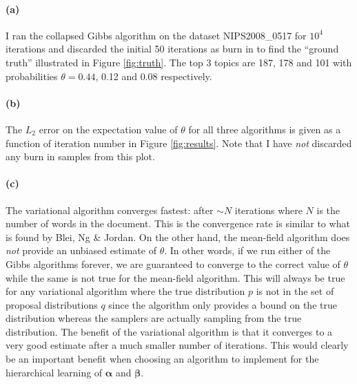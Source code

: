 \documentclass[11pt]{article}
\newcommand{\fig}[1]{Figure \ref{fig:#1}}
\newcommand{\bvec}[1]{\ensuremath{\boldsymbol{#1}}}
\newcommand{\code}[1]{{\sffamily #1}}
\newcommand{\ala}{\bvec{\alpha}}
\newcommand{\ba}{\bvec{\beta}}
\begin{document}
\paragraph{(a)}
I ran the collapsed Gibbs algorithm on the dataset \code{NIPS2008\_0517}
for $10^4$ iterations and discarded the initial 50 iterations as burn in
to find the ``ground truth'' illustrated in \fig{truth}. The top 3 topics
are 187, 178 and 101 with probabilities $\theta = 0.44$, 0.12 and 0.08
respectively.

\paragraph{(b)}
The $L_2$ error on the expectation value of $\theta$ for all three algorithms
is given as a function of iteration number in \fig{results}. Note that I have
\emph{not} discarded any burn in samples from this plot.

\paragraph{(c)}
The variational algorithm converges fastest: after $\sim N$ iterations where
$N$ is the number of words in the document. This is the convergence rate
is similar to what is found by Blei, Ng \& Jordan. On the other hand,
the mean-field algorithm does \emph{not} provide an unbiased estimate of
$\theta$. In other words, if we run either of the Gibbs algorithms forever,
we are guaranteed to converge to the correct value of $\theta$ while the
same is not true for the mean-field algorithm. This will always be true
for any variational algorithm where the true distribution $p$ is not in the
set of proposal distributions $q$ since the algorithm only provides a bound
on the true distribution whereas the samplers are actually sampling from
the true distribution. The benefit of the variational algorithm is that it
converges to a very good estimate after a much smaller number of iterations.
This would clearly be an important benefit when choosing an algorithm to
implement for the hierarchical learning of $\ala$ and $\ba$.
\end{document}
